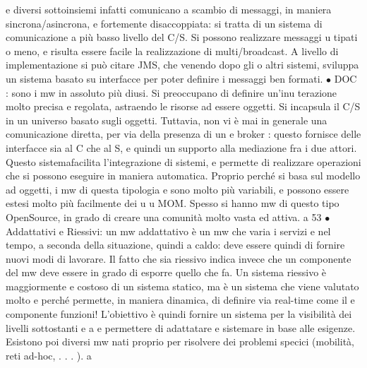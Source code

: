 \documentclass[a4paper,12pt]{article}
\begin{document}
e
diversi sottoinsiemi infatti comunicano a scambio di messaggi, in maniera
sincrona/asincrona, e fortemente disaccoppiata: si tratta di un sistema di
comunicazione a più basso livello del C/S. Si possono realizzare messaggi
u
tipati o meno, e risulta essere facile la realizzazione di multi/broadcast.
A livello di implementazione si può citare JMS, che venendo dopo gli
o
altri sistemi, sviluppa un sistema basato su interfacce per poter definire i
messaggi ben formati.
$\bullet$ DOC : sono i mw in assoluto più diusi. Si preoccupano di definire un'inu
terazione molto precisa e regolata, astraendo le risorse ad essere oggetti.
Si incapsula il C/S in un universo basato sugli oggetti. Tuttavia, non vi
è mai in generale una comunicazione diretta, per via della presenza di un
e
broker : questo fornisce delle interfacce sia al C che al S, e quindi un supporto alla mediazione fra i due attori.
Questo sistemafacilita l'integrazione
di sistemi, e permette di realizzare operazioni che si possono eseguire in
maniera automatica.
Proprio perché si basa sul modello ad oggetti, i mw di questa tipologia
e
sono molto più variabili, e possono essere estesi molto più facilmente dei
u
u
MOM. Spesso si hanno mw di questo tipo OpenSource, in grado di creare
una comunità molto vasta ed attiva.
a
53
$\bullet$ Addattativi e Riessivi: un mw addattativo è un mw che varia i servizi
e
nel tempo, a seconda della situazione, quindi a caldo: deve essere quindi
di fornire nuovi modi di lavorare.
Il fatto che sia riessivo indica invece che un componente del mw deve essere in grado di esporre quello che fa. Un
sistema riessivo è maggiormente
e
costoso di un sistema statico, ma è un sistema che viene valutato molto
e
perché permette, in maniera dinamica, di definire via real-time come il
e
componente funzioni!
L'obiettivo è quindi fornire un sistema per la visibilità dei livelli sottostanti
e
a
e permettere di adattatare e sistemare in base alle esigenze.
Esistono poi diversi mw nati proprio per risolvere dei problemi specici (mobilità, reti ad-hoc, . . . ).
a
\end{document}
